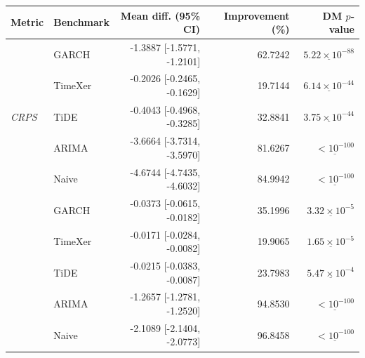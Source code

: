 \begin{tabular}{llrrr}
\toprule
Metric & Benchmark & Mean diff. (95\% CI) & Improvement (\%) & DM $p$-value \\
\midrule
\multirow{5}{*}{\textit{CRPS}}
 & GARCH & -1.3887 [-1.5771, -1.2101] & 62.7242 & $\underline{5.22 \times 10^{-88}}$ \\
 & TimeXer & -0.2026 [-0.2465, -0.1629] & 19.7144 & $\underline{6.14 \times 10^{-44}}$ \\
 & TiDE & -0.4043 [-0.4968, -0.3285] & 32.8841 & $\underline{3.75 \times 10^{-44}}$ \\
 & ARIMA & -3.6664 [-3.7314, -3.5970] & 81.6267 & $\underline{< 10^{-100}}$ \\
 & Naive & -4.6744 [-4.7435, -4.6032] & 84.9942 & $\underline{< 10^{-100}}$ \\
\addlinespace \midrule
\multirow{5}{*}{\textit{twCRPS}}
 & GARCH & -0.0373 [-0.0615, -0.0182] & 35.1996 & $\underline{3.32 \times 10^{-5}}$ \\
 & TimeXer & -0.0171 [-0.0284, -0.0082] & 19.9065 & $\underline{1.65 \times 10^{-5}}$ \\
 & TiDE & -0.0215 [-0.0383, -0.0087] & 23.7983 & $\underline{5.47 \times 10^{-4}}$ \\
 & ARIMA & -1.2657 [-1.2781, -1.2520] & 94.8530 & $\underline{< 10^{-100}}$ \\
 & Naive & -2.1089 [-2.1404, -2.0773] & 96.8458 & $\underline{< 10^{-100}}$ \\
\bottomrule
\end{tabular}